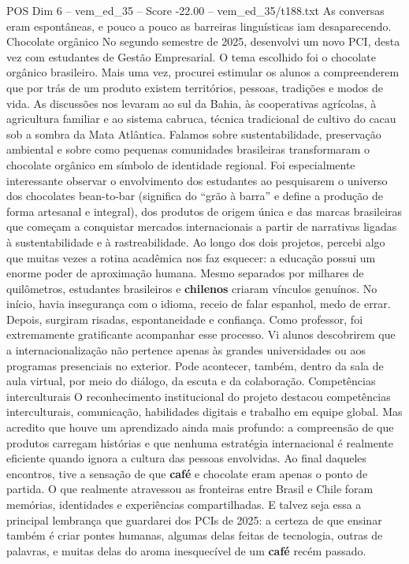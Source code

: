 \begin{textsample}{POS Dim 6 – vem\_ed\_35 – Score -22.00 – vem\_ed\_35/t188.txt}
As conversas eram espontâneas, e pouco a pouco as barreiras linguísticas iam desaparecendo.
Chocolate orgânico No segundo semestre de 2025, desenvolvi um novo PCI, desta vez com estudantes de Gestão Empresarial.
O tema escolhido foi o chocolate orgânico brasileiro.
Mais uma vez, procurei estimular os alunos a compreenderem que por trás de um produto existem territórios, pessoas, tradições e modos de vida.
As discussões nos levaram ao sul da Bahia, às cooperativas agrícolas, à agricultura familiar e ao sistema cabruca, técnica tradicional de cultivo do cacau sob a sombra da Mata Atlântica.
Falamos sobre sustentabilidade, preservação ambiental e sobre como pequenas comunidades brasileiras transformaram o chocolate orgânico em símbolo de identidade regional.
Foi especialmente interessante observar o envolvimento dos estudantes ao pesquisarem o universo dos chocolates bean-to-bar (significa do “grão à barra” e define a produção de forma artesanal e integral), dos produtos de origem única e das marcas brasileiras que começam a conquistar mercados internacionais a partir de narrativas ligadas à sustentabilidade e à rastreabilidade.
Ao longo dos dois projetos, percebi algo que muitas vezes a rotina acadêmica nos faz esquecer: a educação possui um enorme poder de aproximação humana.
Mesmo separados por milhares de quilômetros, estudantes brasileiros e \textbf{chilenos} criaram vínculos genuínos.
No início, havia insegurança com o idioma, receio de falar espanhol, medo de errar.
Depois, surgiram risadas, espontaneidade e confiança.
Como professor, foi extremamente gratificante acompanhar esse processo.
Vi alunos descobrirem que a internacionalização não pertence apenas às grandes universidades ou aos programas presenciais no exterior.
Pode acontecer, também, dentro da sala de aula virtual, por meio do diálogo, da escuta e da colaboração.
Competências interculturais O reconhecimento institucional do projeto destacou competências interculturais, comunicação, habilidades digitais e trabalho em equipe global.
Mas acredito que houve um aprendizado ainda mais profundo: a compreensão de que produtos carregam histórias e que nenhuma estratégia internacional é realmente eficiente quando ignora a cultura das pessoas envolvidas.
Ao final daqueles encontros, tive a sensação de que \textbf{café} e chocolate eram apenas o ponto de partida.
O que realmente atravessou as fronteiras entre Brasil e Chile foram memórias, identidades e experiências compartilhadas.
E talvez seja essa a principal lembrança que guardarei dos PCIs de 2025: a certeza de que ensinar também é criar pontes humanas, algumas delas feitas de tecnologia, outras de palavras, e muitas delas do aroma inesquecível de um \textbf{café} recém passado.

\end{textsample}
